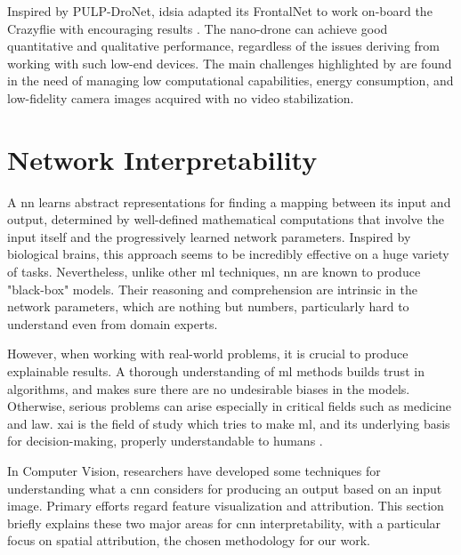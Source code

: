 Inspired by PULP-DroNet, \gls{idsia} adapted its FrontalNet \cite{mantegazza2019visionbased} to work on-board the Crazyflie with encouraging results \cite{zimmerman2020thesis}. The nano-drone can achieve good quantitative and qualitative performance, regardless of the issues deriving from working with such low-end devices. The main challenges highlighted by \cite{zimmerman2020thesis} are found in the need of managing low computational capabilities, energy consumption, and low-fidelity camera images acquired with no video stabilization.




\section{Network Interpretability}
\label{sec:network-interpretability}


A \gls{nn} learns abstract representations for finding a mapping between its input and output, determined by well-defined mathematical computations that involve the input itself and the progressively learned network parameters. Inspired by biological brains, this approach seems to be incredibly effective on a huge variety of tasks. Nevertheless, unlike other \gls{ml} techniques, \gls{nn} are known to produce "black-box" models. Their reasoning and comprehension are intrinsic in the network parameters, which are nothing but numbers, particularly hard to understand even from domain experts. 

However, when working with real-world problems, it is crucial to produce explainable results. A thorough understanding of \gls{ml} methods builds trust in algorithms, and makes sure there are no undesirable biases in the models. Otherwise, serious problems can arise especially in critical fields such as medicine and law. \gls{xai} is the field of study which tries to make \gls{ml}, and its underlying basis for decision-making, properly understandable to humans \cite{xai-wiki}.

In Computer Vision, researchers have developed some techniques for understanding what a \gls{cnn} considers for producing an output based on an input image. Primary efforts regard feature visualization and attribution. This section briefly explains these two major areas for \gls{cnn} interpretability, with a particular focus on spatial attribution, the chosen methodology for our work.



